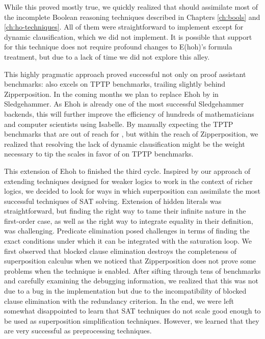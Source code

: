 While this proved mostly true, we quickly realized that \ehohii{} should
assimilate most of the incomplete Boolean reasoning techniques described in Chapters
\ref{ch:bools} and \ref{ch:ho-techniques}. All of them were straightforward to
implement except for dynamic clausification, which we did not implement. It is
possible that support for this technique does not require profound changes to
E(hoh)'s formula treatment, but due to a lack of time we did not explore this
alley.

This highly pragmatic approach proved successful not only on proof assistant
benchmarks: \ehohii{} also excels on TPTP benchmarks, trailing slightly behind
Zipperposition. In the coming months we plan to replace Ehoh by \ehohii{} in Sledgehammer.
As Ehoh is already one of the most successful Sledgehammer backends,
this will further improve the efficiency of hundreds of mathematicians and computer scientists using Isabelle.
By manually expecting the TPTP benchmarks that are out of reach
for \ehohii{}, but within the reach of Zipperposition, we realized that resolving the lack of
dynamic clausification might be the weight necessary to tip the scales in
favor of \ehohii{} on TPTP benchmarks. 

This extension of Ehoh to \ehohii{} finished the third cycle. Inspired by our
approach of extending techniques designed for weaker logics to work in the
context of richer logics, we decided to look for ways in which superposition can
assimilate the most successful techniques of SAT solving. Extension of hidden
literals was straightforward, but finding the right way to tame their infinite
nature in the first-order case, as well as the right way to integrate equality
in their definition, was challenging. Predicate elimination posed challenges in
terms of finding the exact conditions under which it can be integrated with the
saturation loop. We first observed that blocked clause elimination destroys the
completeness of superposition calculus when we noticed that Zipperposition does
not prove some problems when the technique is enabled. After sifting through tens of
benchmarks and carefully examining the debugging information, we realized that
this was not due to a bug in the implementation but due to the incompatibility of
blocked clause elimination with the redundancy criterion. In the end, we were left
somewhat disappointed to learn that SAT techniques do not scale good enough to be used
as superposition simplification techniques. However, we learned that they are
very successful as preprocessing techniques.

